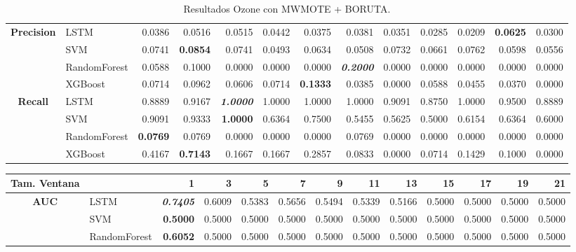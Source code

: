 \begin{table}[H]
\begin{adjustbox}{max width=14cm}
\begin{tabular}{|c|l|r|r|r|r|r|r|r|r|r|r|r|}
			\hline
			\textbf{Precision} &  LSTM &  0.0386 &  0.0516 &  0.0515 &  0.0442 &  0.0375 &  0.0381 &  0.0351 &  0.0285 &  0.0209 & \textbf{  0.0625 } &  0.0300 \\
			&  SVM &  0.0741 & \textbf{  0.0854 } &  0.0741 &  0.0493 &  0.0634 &  0.0508 &  0.0732 &  0.0661 &  0.0762 &  0.0598 &  0.0556 \\
			&  RandomForest &  0.0588 &  0.1000 &  0.0000 &  0.0000 &  0.0000 & \textit{ \textbf{  0.2000 } } &  0.0000 &  0.0000 &  0.0000 &  0.0000 &  0.0000 \\
			&  XGBoost &  0.0714 &  0.0962 &  0.0606 &  0.0714 & \textbf{  0.1333 } &  0.0385 &  0.0000 &  0.0588 &  0.0455 &  0.0370 &  0.0000 \\
			\hline
			\textbf{Recall} &  LSTM &  0.8889 &  0.9167 & \textit{ \textbf{  1.0000 } } &  1.0000 &  1.0000 &  1.0000 &  0.9091 &  0.8750 &  1.0000 &  0.9500 &  0.8889 \\
			&  SVM &  0.9091 &  0.9333 & \textbf{  1.0000 } &  0.6364 &  0.7500 &  0.5455 &  0.5625 &  0.5000 &  0.6154 &  0.6364 &  0.6000 \\
			&  RandomForest & \textbf{  0.0769 } &  0.0769 &  0.0000 &  0.0000 &  0.0000 &  0.0769 &  0.0000 &  0.0000 &  0.0000 &  0.0000 &  0.0000 \\
			&  XGBoost &  0.4167 & \textbf{  0.7143 } &  0.1667 &  0.1667 &  0.2857 &  0.0833 &  0.0000 &  0.0714 &  0.1429 &  0.1000 &  0.0000 \\
			\hline
		\end{tabular}
	\end{adjustbox}
	\caption{Resultados Ozone con MWMOTE + BORUTA.}
	\label{tab:Ozone_MWMOTE_BORUTA}
\end{table}\begin{table}[H]
\centering
\begin{adjustbox}{max width=14cm}
	\begin{tabular}{|c|l|r|r|r|r|r|r|r|r|r|r|r|}
		\hline
		\textbf{Tam. Ventana} &         &      1  &      3  &      5  &      7  &      9  &      11 &      13 &      15 &      17 &      19 &      21 \\
		\hline
		\textbf{AUC} &  LSTM & \textit{ \textbf{  0.7405 } } &  0.6009 &  0.5383 &  0.5656 &  0.5494 &  0.5339 &  0.5166 &  0.5000 &  0.5000 &  0.5000 &  0.5000 \\
		&  SVM & \textbf{  0.5000 } &  0.5000 &  0.5000 &  0.5000 &  0.5000 &  0.5000 &  0.5000 &  0.5000 &  0.5000 &  0.5000 &  0.5000 \\
		&  RandomForest & \textbf{  0.6052 } &  0.5000 &  0.5000 &  0.5000 &  0.5000 &  0.5000 &  0.5000 &  0.5000 &  0.5000 &  0.5000 &  0.5000 \\

\end{tabular}
\end{adjustbox}
\end{table}
